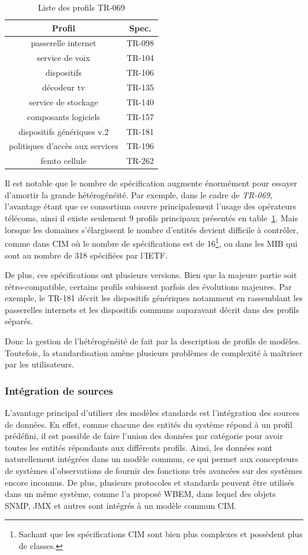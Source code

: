\begin{table}
\centering
{\scriptsize
\begin{tabular}{cc}
\toprule
Profil & Spec. \\ \toprule
passerelle internet & TR-098 \\ \midrule
service de voix & TR-104 \\ \midrule
dispositifs & TR-106 \\ \midrule
décodeur tv & TR-135 \\ \midrule
service de stockage & TR-140 \\ \midrule
composants logiciels & TR-157 \\ \midrule
dispositifs génériques v.2 & TR-181 \\  \midrule
politiques d'accès aux services &  TR-196 \\ \midrule
femto cellule & TR-262 \\ \bottomrule
\end{tabular}}
\caption{Liste  des profils TR-069}\label{tab:rw:supervision:tr069dm}
\end{table}
Il est notable que le nombre de spécification augmente énormément pour essayer d'amortir la grande hétérogénéité. Par exemple, dans le cadre de \textit{TR-069}, l'avantage étant que ce consortium couvre principalement l'usage des opérateurs télécoms, ainsi il existe seulement 9 profils principaux présentés en table~\ref{tab:rw:supervision:tr069dm}. Mais lorsque les domaines s'élargissent le nombre d'entités devient difficile à contrôler, comme dans CIM où le nombre de spécifications est de 16\footnote{Sachant que les spécifications CIM sont bien plus complexes et possèdent plus de classes.}, ou dans les MIB qui sont au nombre de 318 spécifiées par l'IETF.

De plus, ces spécifications ont plusieurs versions. Bien que la majeure partie soit rétro-compatible, certains profils subissent parfois des évolutions majeures. Par exemple, le TR-181 décrit les dispositifs génériques notamment en rassemblant les passerelles internets et les dispositifs communs auparavant décrit dans des profils séparés. 

Donc la gestion de l'hétérogénéité de fait par la description de profils de modèles. Toutefois, la standardisation amène plusieurs problèmes de complexité à maîtriser par les utilisateurs.

\subsubsection{Intégration de sources}
L'avantage principal d'utiliser des modèles standards est l'intégration des sources de données. En effet, comme chacune des entités du système répond à un profil prédéfini, il est possible de faire l'union des données par catégorie pour avoir toutes les entités répondants aux différents profils. Ainsi, les données sont naturellement intégrées dans un modèle commun, ce qui permet aux concepteurs de systèmes d'observations de fournir des fonctions très avancées sur des systèmes encore inconnus. De plus, plusieurs protocoles et standards peuvent être utilisés dans un même système, comme l'a proposé WBEM, dans lequel des objets SNMP, JMX et autres sont intégrés à un modèle commun CIM.


